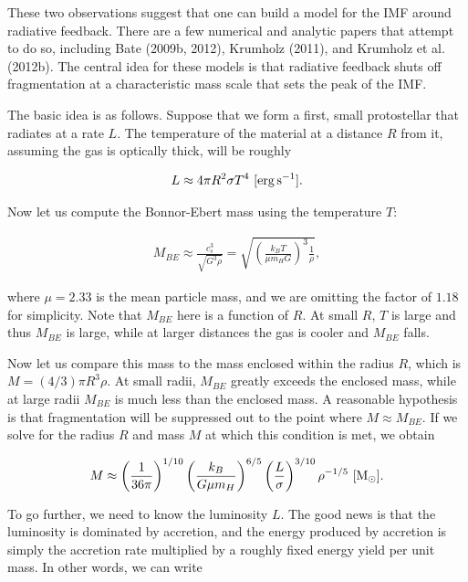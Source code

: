 \documentclass[a4paper,10pt]{article}
\begin{document}
{\noindent}These two observations suggest that one can build a model for the IMF around radiative feedback. There are a few numerical and analytic papers that attempt to do so, including Bate (2009b, 2012), Krumholz (2011), and Krumholz et al. (2012b). The central idea for these models is that radiative feedback shuts off fragmentation at a characteristic mass scale that sets the peak of the IMF.

{\noindent}The basic idea is as follows. Suppose that we form a first, small protostellar that radiates at a rate $L$. The temperature of the material at a distance $R$ from it, assuming the gas is optically thick, will be roughly

\begin{align*}
    L\approx 4\pi R^2\sigma T^4 ~ [{\rm erg\,s^{-1}}].
\end{align*}

{\noindent}Now let us compute the Bonnor-Ebert mass using the temperature $T$:

\begin{align*}
    M_{BE} \approx \frac{c_s^3}{\sqrt{G^3\rho}} = \sqrt{\left(\frac{k_BT}{\mu m_HG}\right)^3\frac{1}{\rho}},
\end{align*}

{\noindent}where $\mu=2.33$ is the mean particle mass, and we are omitting the factor of $1.18$ for simplicity. Note that $M_{BE}$ here is a function of $R$. At small $R$, $T$ is large and thus $M_{BE}$ is large, while at larger distances the gas is cooler and $M_{BE}$ falls.

{\noindent}Now let us compare this mass to the mass enclosed within the radius $R$, which is $M=(4/3)\pi R^3\rho$. At small radii, $M_{BE}$ greatly exceeds the enclosed mass, while at large radii $M_{BE}$ is much less than the enclosed mass. A reasonable hypothesis is that fragmentation will be suppressed out to the point where $M\approx M_{BE}$. If we solve for the radius $R$ and mass $M$ at which this condition is met, we obtain

\begin{align*}
    M\approx \left(\frac{1}{36\pi}\right)^{1/10} \left(\frac{k_B}{G\mu m_H}\right)^{6/5} \left(\frac{L}{\sigma}\right)^{3/10} \rho^{-1/5} ~ [{\rm M_\odot}].
\end{align*}

{\noindent}To go further, we need to know the luminosity $L$. The good news is that the luminosity is dominated by accretion, and the energy produced by accretion is simply the accretion rate multiplied by a roughly fixed energy yield per unit mass. In other words, we can write
\end{document}
